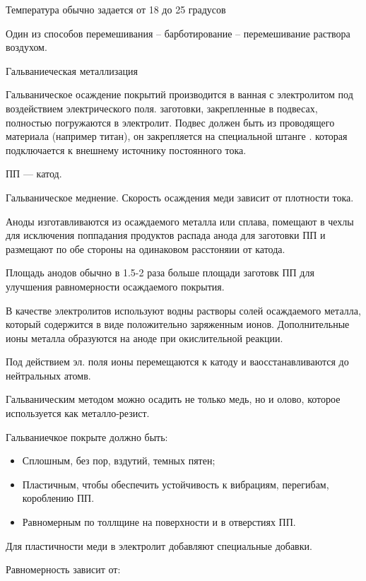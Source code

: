 \documentclass{article}
\begin{document}
Температура обычно задается от 18 до 25 градусов

Один из способов перемешивания -- барботирование -- перемешивание раствора воздухом.

Гальваниеческая металлизация

Гальваническое осаждение покрытий производится в ванная с электролитом под воздействием электрического поля. заготовки, закрепленные в подвесах, полностью погружаются в электролит. Подвес должен быть из проводящего материала (например титан), он закрепляется на специальной штанге . которая подключается к внешнему источнику постоянного тока.

ПП --- катод.

Гальваническое меднение. Скорость осаждения меди зависит от плотности тока.

Аноды изготавливаются из осаждаемого металла или сплава, помещают в чехлы для исключения поппадания продуктов распада анода для заготовки ПП и размещают по обе стороны на одинаковом расстоняии от катода.

Площадь анодов обычно в 1.5-2 раза больше площади заготовк ПП для улучшения равномерности осаждаемого покрытия.

В качестве электролитов используют водны растворы солей осаждаемого металла, который содержится в виде положительно заряженным ионов. Дополнительные ионы металла образуются на аноде при окислительной реакции.

Под действием эл. поля ионы перемещаются к катоду и ваосстанавливаются до нейтральных атомв.

Гальваническим методом можно осадить не только медь, но и олово, которое используется как металло-резист.

Гальваниечкое покрыте должно быть:

\begin{itemize}
	\item Сплошным, без пор, вздутий, темных пятен;
	\item Пластичным, чтобы обеспечить устойчивость к вибрациям, перегибам, короблению ПП.
	\item Равномерным по толлщине на поверхности и в отверстиях ПП.
\end{itemize}

Для пластичности меди в электролит добавляют специальные добавки.

Равномерность зависит от:
\end{document}
